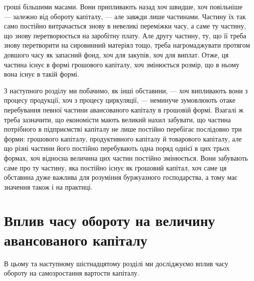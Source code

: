 \parcont{}  %
гроші більшими масами. Вони припливають назад хоч швидше, хоч повільніше
— залежно від обороту капіталу, — але завжди лише частинами.
Частину їх так само постійно витрачається знову в невеликі переміжки
часу, а саме ту частину, що знову перетворюється на заробітну плату.
Але другу частину, ту, що її треба знову перетворити на сировинний
матеріял тощо, треба нагромаджувати протягом довшого часу як запасний
фонд, хоч для закупів, хоч для виплат. Отже, ця частина існує в формі
грошового капіталу, хоч змінюється розмір, що в ньому вона існує в
такій формі.

З наступного розділу ми побачимо, як інші обставини, — хоч випливають
вони з процесу продукції, хоч з процесу циркуляції, — неминуче
зумовлюють отаке перебування певної частини авансованого капіталу в
грошовій формі. Взагалі ж треба зазначити, що економісти мають великий
нахил забувати, що частина потрібного в підприємстві капіталу не лише
постійно перебігає послідовно три форми: грошового капіталу, продуктивного
капіталу й товарового капіталу, але що різні частини його постійно
перебувають одна поряд однієї в цих трьох формах, хоч відносна
величина цих частин постійно змінюється. Вони забувають саме про ту
частину, яка постійно існує як грошовий капітал, хоч саме ця обставина
дуже важлива для розуміння буржуазного господарства, а тому має значення
також і на практиці.

\section{Вплив часу обороту на величину авансованого капіталу}

В цьому та наступному шістнадцятому розділі ми досліджуємо вплив
часу обороту на самозростання вартости капіталу.

